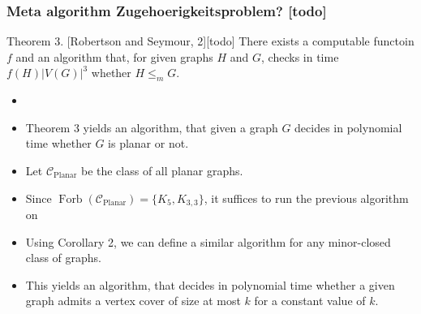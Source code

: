\documentclass[t,usenames,dvipsnames]{beamer}
\newcommand{\cplanar}{\mathcal{C}_{\operatorname{Planar}}}
\begin{document}
\begin{frame} \frametitle{Meta algorithm Zugehoerigkeitsproblem? [todo]}
	\begin{block}{Theorem 3. [Robertson and Seymour, 2][todo]}
			There exists a computable functoin $f$ and an algorithm that, for given
			graphs $H$ and $G$, checks in time $f(H)|V(G)|^3$ whether $H \leq_m G$.
	\end{block}
	\begin{itemize}[<+->]
		\item []
		\item Theorem 3 yields an algorithm, that given a graph $G$ decides in polynomial
			time whether $G$ is planar or not.
		\item Let $\cplanar$ be the class of all planar graphs.
		\item Since $\operatorname{Forb}(\cplanar) = \{K_5, K_{3,3}\}$, it suffices to run
			the previous algorithm on 
		\item Using Corollary 2, we can define a similar algorithm for any minor-closed
			class of graphs.
		\item This yields an algorithm, that decides in polynomial time whether a given
			graph admits a vertex cover of size at most $k$ for a constant value of
			$k$.
	\end{itemize}
\end{frame}
\end{document}
